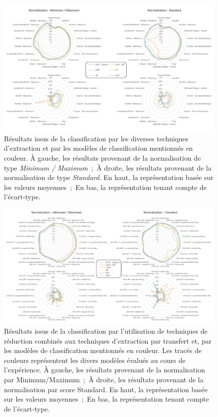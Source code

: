 \begin{landscape}
    \begin{figure}[H]
        \centering
        \includegraphics[width=0.9\linewidth]{contents/chapter_5/resources/results_image_classification.pdf}    
        \caption{Résultats issus de la classification par les diverses techniques d'extraction et par les modèles de classification mentionnés en couleur. À gauche, les résultats provenant de la normalisation de type \textit{Minimum / Maximum}~;~À droite, les résultats provenant de la normalisation de type \textit{Standard}. En haut, la représentation basée sur les valeurs moyennes~;~En bas, la représentation tenant compte de l'écart-type.}
        \label{fig:results_image_classification}
    \end{figure}
\end{landscape}

\begin{landscape}
    \begin{figure}[H]
        \centering
        \includegraphics[width=0.95\linewidth]{contents/chapter_5/resources/results_image_classification_reduction.pdf}
        \caption{Résultats issus de la classification par l'utilisation de techniques de réduction combinés aux techniques d'extraction par transfert et, par les modèles de classification mentionnés en couleur. Les tracés de couleurs représentent les divers modèles évalués au cours de l'expérience. À gauche, les résultats provenant de la normalisation par Minimum/Maximum~;~À droite, les résultats provenant de la normalisation par score Standard. En haut, la représentation basée sur les valeurs moyennes~;~En bas, la représentation tenant compte de l'écart-type.}
        \label{fig:results_image_classification_reduction}
    \end{figure}
\end{landscape}

